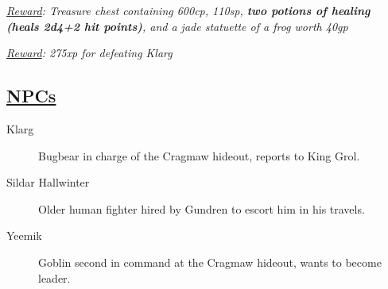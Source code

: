 \emph{\underline{Reward}: Treasure chest containing 600cp, 110sp, \textbf{two potions of healing (heals 2d4+2 hit points)}, and a jade statuette of a frog worth 40gp}

\emph{\underline{Reward}: 275xp for defeating Klarg} 


\subsection{\underline{NPCs}}
\begin{description}
	\item[Klarg] Bugbear in charge of the Cragmaw hideout, reports to King Grol.
	\item[Sildar Hallwinter] Older human fighter hired by Gundren to escort him in his travels.
	\item[Yeemik] Goblin second in command at the Cragmaw hideout, wants to become leader.
\end{description}